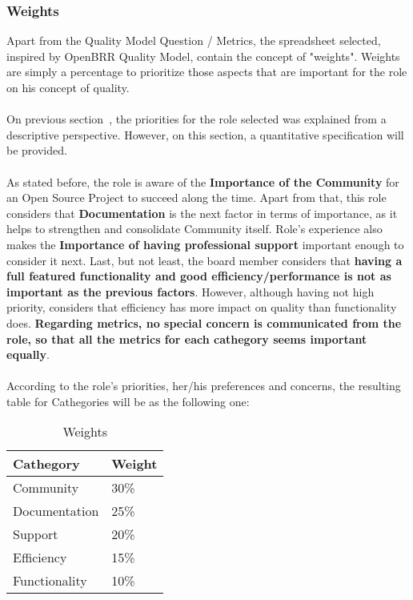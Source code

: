 \documentclass[11pt]{article}
\begin{document}
\subsubsection{Weights}
Apart from the Quality Model Question / Metrics, the spreadsheet selected, inspired by OpenBRR Quality Model, contain the concept of "weights". Weights are simply a percentage to prioritize those aspects that are important for the role on his concept of quality. \\
\\
On previous section~, the priorities for the role selected was explained from a descriptive perspective. However, on this section, a quantitative specification will be provided.\\
\\
As stated before, the role is aware of the \textbf{Importance of the Community} for an Open Source Project to succeed along the time. Apart from that, this role considers that \textbf{Documentation} is the next factor in terms of importance, as it helps to strengthen and consolidate Community itself. Role's experience also makes the \textbf{Importance of having professional support} important enough to consider it next. Last, but not least, the board member considers that \textbf{having a full featured functionality and good efficiency/performance is not as important as the previous factors}. However, although having not high priority, considers that efficiency has more impact on quality than functionality does. \textbf{Regarding metrics, no special concern is communicated from the role, so that all the metrics for each cathegory seems important equally}.\\
\\
According to the role's priorities, her/his preferences and concerns, the resulting table for Cathegories will be as the following one:
\begin{table}[H]
  \begin{center}
    \begin{tabular}{ | l | l | }
    \hline
    Cathegory & Weight \\
    \hline
    Community & 30\%\\
    Documentation & 25\% \\
    Support & 20\% \\
    Efficiency & 15\% \\
    Functionality & 10\% \\
    \hline
    \end{tabular}
    \caption{Weights}
    \label{tab:weights}
  \end{center}
\end{table}
\end{document}
